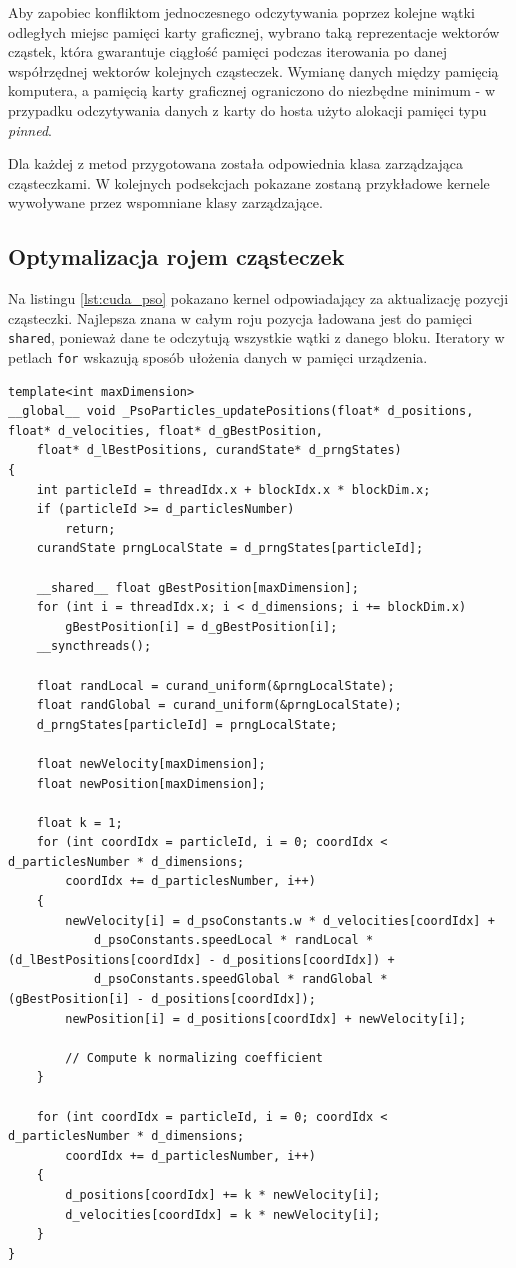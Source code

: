 \documentclass[11pt, a4paper, oneside]{article}
\begin{document}
Aby zapobiec konfliktom jednoczesnego odczytywania poprzez kolejne wątki odległych miejsc pamięci karty graficznej, wybrano taką reprezentacje wektorów cząstek, która gwarantuje ciągłość pamięci podczas iterowania po danej współrzędnej wektorów kolejnych cząsteczek. Wymianę danych między pamięcią komputera, a pamięcią karty graficznej ograniczono do niezbędne minimum - w przypadku odczytywania danych z karty do hosta użyto alokacji pamięci typu \textit{pinned}.

Dla każdej z metod przygotowana została odpowiednia klasa zarządzająca cząsteczkami. W kolejnych podsekcjach pokazane zostaną przykładowe kernele wywoływane przez wspomniane  klasy zarządzające.

\subsection{Optymalizacja rojem cząsteczek}
Na listingu \ref{lst:cuda_pso} pokazano kernel odpowiadający za aktualizację pozycji cząsteczki. Najlepsza znana w całym roju pozycja ładowana jest do pamięci \lstinline[style=mycpp]{shared}, ponieważ dane te odczytują wszystkie wątki z danego bloku. Iteratory w petlach \lstinline[style=mycpp]{for} wskazują sposób ułożenia danych w pamięci urządzenia.

\begin{lstlisting}[style=mycpp, label=lst:cuda_pso, caption={Kernel CUDA aktualizujący cząsteczkę PSO.}]
template<int maxDimension>
__global__ void _PsoParticles_updatePositions(float* d_positions, float* d_velocities, float* d_gBestPosition,
	float* d_lBestPositions, curandState* d_prngStates)
{
	int particleId = threadIdx.x + blockIdx.x * blockDim.x;
	if (particleId >= d_particlesNumber)
		return;
	curandState prngLocalState = d_prngStates[particleId];

	__shared__ float gBestPosition[maxDimension];
	for (int i = threadIdx.x; i < d_dimensions; i += blockDim.x)
		gBestPosition[i] = d_gBestPosition[i];
	__syncthreads();

	float randLocal = curand_uniform(&prngLocalState);
	float randGlobal = curand_uniform(&prngLocalState);
	d_prngStates[particleId] = prngLocalState;

	float newVelocity[maxDimension];
	float newPosition[maxDimension];

	float k = 1;
	for (int coordIdx = particleId, i = 0; coordIdx < d_particlesNumber * d_dimensions;
		coordIdx += d_particlesNumber, i++)
	{
		newVelocity[i] = d_psoConstants.w * d_velocities[coordIdx] +
			d_psoConstants.speedLocal * randLocal * (d_lBestPositions[coordIdx] - d_positions[coordIdx]) +
			d_psoConstants.speedGlobal * randGlobal * (gBestPosition[i] - d_positions[coordIdx]);
		newPosition[i] = d_positions[coordIdx] + newVelocity[i];

		// Compute k normalizing coefficient 
	}

	for (int coordIdx = particleId, i = 0; coordIdx < d_particlesNumber * d_dimensions;
		coordIdx += d_particlesNumber, i++)
	{
		d_positions[coordIdx] += k * newVelocity[i];
		d_velocities[coordIdx] = k * newVelocity[i];
	}
}
\end{lstlisting}
\end{document}
